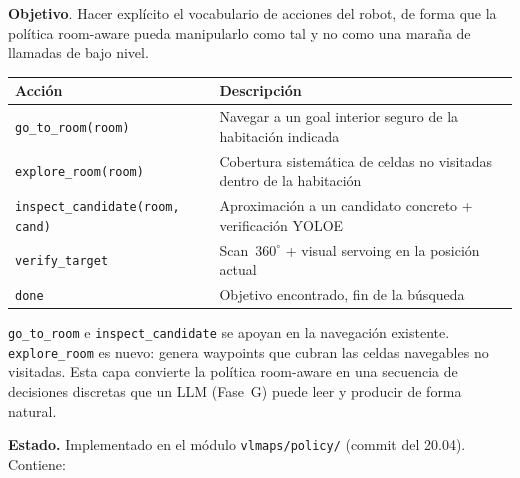 \documentclass[11pt,a4paper]{article}
\begin{document}
\textbf{Objetivo}. Hacer explícito el vocabulario de acciones del robot, de
forma que la política room-aware pueda manipularlo como tal y no como una
maraña de llamadas de bajo nivel.

\begin{center}
\begin{tabular}{lp{9cm}}
\toprule
\textbf{Acción} & \textbf{Descripción} \\
\midrule
\texttt{go\_to\_room(room)} &
  Navegar a un goal interior seguro de la habitación indicada \\
\texttt{explore\_room(room)} &
  Cobertura sistemática de celdas no visitadas dentro de la habitación \\
\texttt{inspect\_candidate(room, cand)} &
  Aproximación a un candidato concreto + verificación YOLOE \\
\texttt{verify\_target} &
  Scan~$360^\circ$ + visual servoing en la posición actual \\
\texttt{done} &
  Objetivo encontrado, fin de la búsqueda \\
\bottomrule
\end{tabular}
\end{center}

\texttt{go\_to\_room} e \texttt{inspect\_candidate} se apoyan en la
navegación existente. \texttt{explore\_room} es nuevo: genera waypoints que
cubran las celdas navegables no visitadas. Esta capa convierte la política
room-aware en una secuencia de decisiones discretas que un LLM (Fase~G) puede
leer y producir de forma natural.

\textbf{Estado.} \textcolor{done}{Implementado} en el módulo
\texttt{vlmaps/policy/} (commit del 20.04). Contiene:
\end{document}
